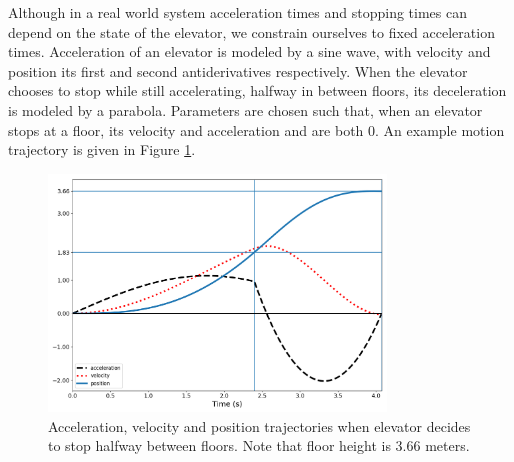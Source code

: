 Although in a real world system acceleration times and stopping times can depend on the state of the elevator, we constrain ourselves to fixed acceleration times. Acceleration of an elevator is modeled by a sine wave, with velocity and position its first and second antiderivatives respectively. When the elevator chooses to stop while still accelerating, halfway in between floors, its deceleration is modeled by a parabola. Parameters are chosen such that, when an elevator stops at a floor, its velocity and acceleration and are both 0. An example motion trajectory is given in Figure \ref{fig:motion}.

\begin{figure}[H]
    \centering
    \includegraphics[width=0.8\textwidth]{../img/elevator_acc_dec.png}
    \caption{Acceleration, velocity and position trajectories when elevator decides to stop halfway between floors. Note that floor height is 3.66 meters.}
    \label{fig:motion}
\end{figure}